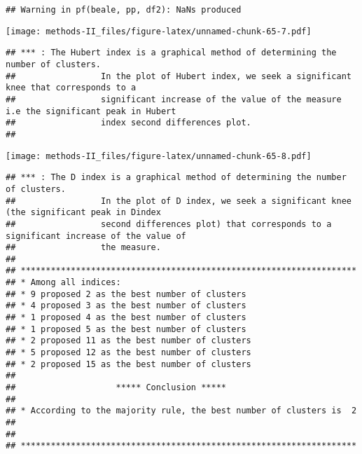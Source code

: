 \documentclass[
]{article}
\newenvironment{Shaded}{\begin{snugshade}}{\end{snugshade}}
\newcommand{\CommentTok}[1]{\textcolor[rgb]{0.56,0.35,0.01}{\textit{#1}}}
\newcommand{\NormalTok}[1]{#1}
\newcommand{\SpecialCharTok}[1]{\textcolor[rgb]{0.00,0.00,0.00}{#1}}
\begin{document}
\begin{verbatim}
## Warning in pf(beale, pp, df2): NaNs produced
\end{verbatim}

\texttt{[image: methods-II\_files/figure-latex/unnamed-chunk-65-7.pdf]}

\begin{verbatim}
## *** : The Hubert index is a graphical method of determining the number of clusters.
##                 In the plot of Hubert index, we seek a significant knee that corresponds to a 
##                 significant increase of the value of the measure i.e the significant peak in Hubert
##                 index second differences plot. 
## 
\end{verbatim}

\texttt{[image: methods-II\_files/figure-latex/unnamed-chunk-65-8.pdf]}

\begin{verbatim}
## *** : The D index is a graphical method of determining the number of clusters. 
##                 In the plot of D index, we seek a significant knee (the significant peak in Dindex
##                 second differences plot) that corresponds to a significant increase of the value of
##                 the measure. 
##  
## ******************************************************************* 
## * Among all indices:                                                
## * 9 proposed 2 as the best number of clusters 
## * 4 proposed 3 as the best number of clusters 
## * 1 proposed 4 as the best number of clusters 
## * 1 proposed 5 as the best number of clusters 
## * 2 proposed 11 as the best number of clusters 
## * 5 proposed 12 as the best number of clusters 
## * 2 proposed 15 as the best number of clusters 
## 
##                    ***** Conclusion *****                            
##  
## * According to the majority rule, the best number of clusters is  2 
##  
##  
## *******************************************************************
\end{verbatim}

\begin{Shaded}
\end{Shaded}
\end{document}

